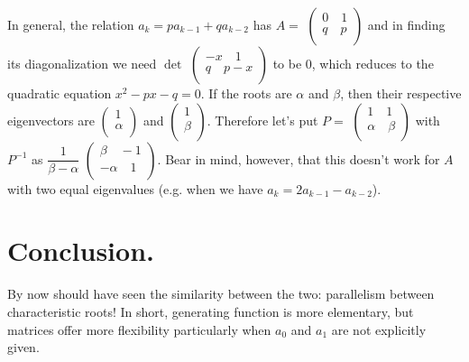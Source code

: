 \documentclass[11pt,a4paper]{article}
\begin{document}
In general, the relation $a_k=pa_{k-1}+qa_{k-2}$ has $A=$ $\left(\begin{array}{cc}
0\quad 1\\
q\quad p\\
\end{array}\right)$ and in finding its diagonalization we need $\det$ $\left(\begin{array}{cc}
-x\quad 1\\
q\quad p-x\\
\end{array}\right)$ to be 0, which reduces to the quadratic equation $x^2-px-q=0$. If the roots are $\alpha$ and $\beta$, then their respective eigenvectors are $\left( \begin{array}{cc}
1\\
\alpha\\
\end{array}\right)$ and $\left( \begin{array}{cc}
1\\
\beta\\
\end{array}\right)$. Therefore let's put $P=$ $\left(\begin{array}{cc}
1\quad 1\\
\alpha\quad \beta\\
\end{array}\right)$ with $P^{-1}$ as $\dfrac{1}{\beta-\alpha}$ $\left(\begin{array}{cc}
\beta\quad -1\\
-\alpha\quad 1\\
\end{array}\right)$. Bear in mind, however, that this doesn't work for $A$ with two equal eigenvalues (e.g. when we have $a_k=2a_{k-1}-a_{k-2}$).

\section{Conclusion.}
By now should have seen the similarity between the two: parallelism between characteristic roots! In short, generating function is more elementary, but matrices offer more flexibility particularly when $a_0$ and $a_1$ are not explicitly given.
\end{document}
